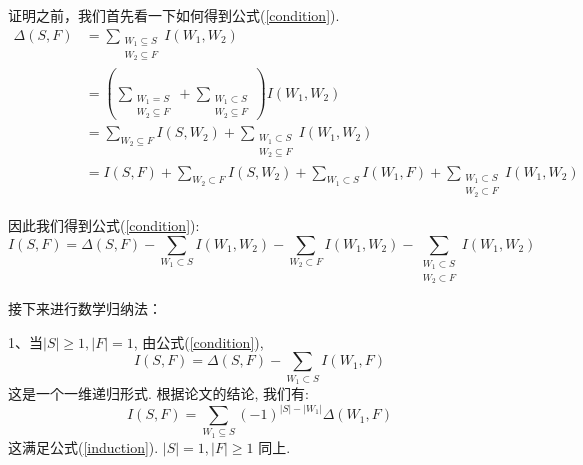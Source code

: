 证明之前，我们首先看一下如何得到公式(\ref{condition}).
\begin{align*}
	\Delta(S, F)&=\sum_{\substack{W_1\subseteq S\\W_2\subseteq F}}I(W_1, W_2)\\
	&=(\sum_{\substack{W_1=S\\W_2\subseteq F}}+\sum_{\substack{W_1\subset S\\W_2\subseteq F}})I(W_1,W_2)\\
	&=\sum_{W_2\subseteq F}I(S,W_2)+\sum_{\substack{W_1\subset S\\W_2\subseteq F}}I(W_1,W_2)\\
	&=I(S,F)+\sum_{W_2\subset F}I(S,W_2)+\sum_{W_1\subset S}I(W_1,F)+\sum_{\substack{W_1\subset S\\W_2\subset F}}I(W_1,W_2)
\end{align*}

因此我们得到公式(\ref{condition}):
$$I(S, F)=\Delta(S, F)-\sum_{W_1\subset S}I(W_1, W_2)-\sum_{W_2\subset F}I(W_1, W_2)-\sum_{\substack{W_1\subset S\\ W_2\subset F}}I(W_1, W_2)$$

接下来进行数学归纳法：

1、当$|S|\geq 1, |F|=1$, 由公式(\ref{condition}),
$$I(S,F)=\Delta(S,F)-\sum_{W_1\subset S}I(W_1,F)$$
这是一个一维递归形式. 根据论文\cite[6--7]{strumbelj2010efficient}的结论, 我们有:
$$I(S,F)=\sum_{W_1\subseteq S}(-1)^{|S|-|W_1|}\Delta(W_1,F)$$
这满足公式(\ref{induction}). $|S|=1, |F|\geq1$ 同上.

